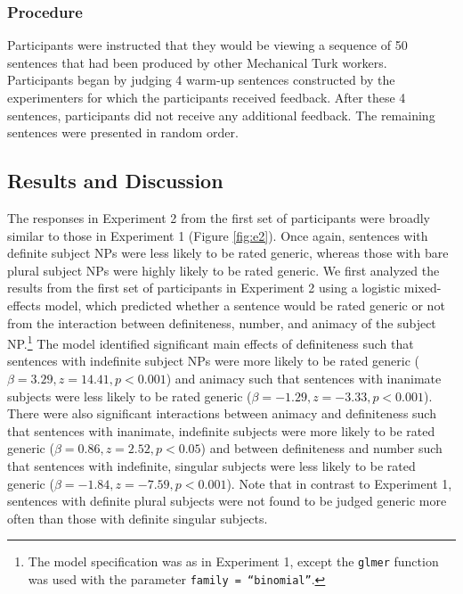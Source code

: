 \documentclass[10pt,letterpaper]{article}
\begin{document}
\subsubsection{Procedure}

Participants were instructed that they would be viewing a sequence of 50 sentences that had been produced by other Mechanical Turk workers. Participants began by judging 4 warm-up sentences constructed by the experimenters for which the participants received feedback. After these 4 sentences, participants did not receive any additional feedback. The remaining sentences were presented in random order.

\subsection{Results and Discussion}

The responses in Experiment 2 from the first set of participants were broadly similar to those in Experiment 1 (Figure \ref{fig:e2}). Once again, sentences with definite subject NPs were less likely to be rated generic, whereas those with bare plural subject NPs were highly likely to be rated generic. We first analyzed the results from the first set of participants in Experiment 2 using a logistic mixed-effects model, which predicted whether a sentence would be rated generic or not from the interaction between definiteness, number, and animacy of the subject NP.\footnote{The model specification was as in Experiment 1, except the \texttt{glmer} function was used with the parameter \texttt{family = ``binomial''}.} The model identified significant main effects of definiteness such that sentences with indefinite subject NPs were more likely to be rated generic (\(\beta = 3.29, z = 14.41, p < 0.001\)) and animacy such that sentences with inanimate subjects were less likely to be rated generic (\(\beta = -1.29, z = -3.33, p < 0.001\)). There were also significant interactions between animacy and definiteness such that sentences with inanimate, indefinite subjects were more likely to be rated generic (\(\beta = 0.86, z = 2.52, p < 0.05\)) and between definiteness and number such that sentences with indefinite, singular subjects were less likely to be rated generic (\(\beta = -1.84, z = -7.59, p < 0.001\)). Note that in contrast to Experiment 1, sentences with definite plural subjects were not found to be judged generic more often than those with definite singular subjects.
\end{document}
